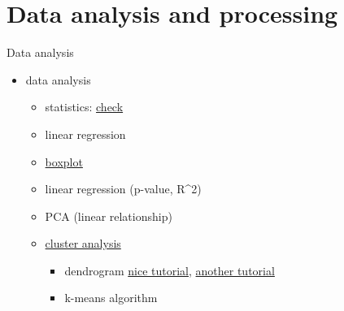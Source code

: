 \documentclass[8pt,ignorenonframetext,]{beamer}
\providecommand{\tightlist}{%
  \setlength{\itemsep}{0pt}\setlength{\parskip}{0pt}}
\begin{document}
\section{Data analysis and
processing}\label{data-analysis-and-processing}

\begin{frame}{Data analysis}

\begin{itemize}
\tightlist
\item
  data analysis

  \begin{itemize}
  \tightlist
  \item
    statistics:
    \href{https://www.hydrology.uni-kiel.de/de/mitarbeiter/Statistics}{check}
  \item
    linear regression
  \item
    \href{https://cran.r-project.org/web/packages/beanplot/vignettes/beanplot.pdf}{boxplot}
  \item
    linear regression (p-value, R\^{}2)
  \item
    PCA (linear relationship)
  \item
    \href{http://www.sthda.com/english/articles/25-cluster-analysis-in-r-practical-guide/111-types-of-clustering-methods-overview-and-quick-start-r-code/}{cluster
    analysis}

    \begin{itemize}
    \tightlist
    \item
      dendrogram
      \href{http://www.sthda.com/english/wiki/beautiful-dendrogram-visualizations-in-r-5-must-known-methods-unsupervised-machine-learning}{nice
      tutorial}, \href{https://rpubs.com/gaston/dendrograms}{another
      tutorial}
    \item
      k-means algorithm
    \end{itemize}
  \end{itemize}
\end{itemize}

\end{frame}
\end{document}

